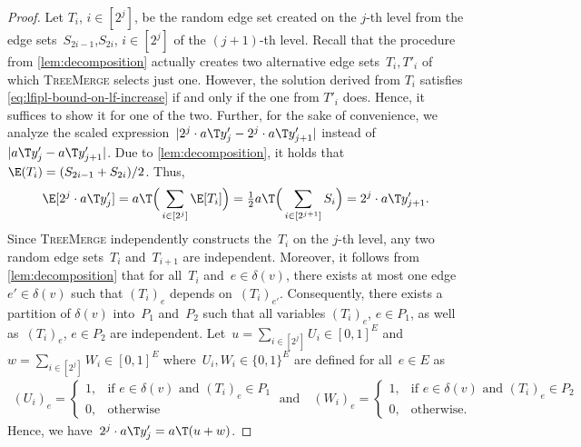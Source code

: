 \begin{proof}
    Let $T_i$, $i \in [2^{j}]$, be the random edge set created on the $j$-th level from the edge sets~$S_{2i-1}$,$S_{2i}$, $i\in [2^{j}]$ of the $(j+1)$-th level.
    Recall that the procedure from \cref{lem:decomposition} actually creates
    two alternative edge sets~$T_i,T'_i$ of which \textsc{TreeMerge} selects just one.
    However, the solution derived from $T_i$ satisfies \cref{eq:lfipl-bound-on-lf-increase} if and only if the one from $T'_i$ does. Hence, it suffices to show
    it for one of the two.
    Further, for the sake of convenience, we analyze the scaled expression~$|2^j \cdot a\T y'_j - 2^j \cdot a\T y'_{j+1}|$ instead of~$|a\T y'_j - a\T y'_{j+1}|$.
    Due to \cref{lem:decomposition}, it holds that $\E(T_i) = (S_{2i-1} + S_{2i})/2$.
    Thus,
    \begin{align*}
        \label{eq:ilf-expected-value}
        \E[2^j \cdot a\T y_{j}'] 
        = a\T \Big(\sum_{i \in [2^j]} \E[T_i] \Big)
        = \tfrac{1}{2} a\T \Big(\sum_{i \in [2^{j+1}]} S_{i} \Big)
        = 2^j \cdot a\T y_{j+1}'.
    \end{align*}
    Since \textsc{TreeMerge} independently constructs the~$T_i$ on the $j$-th level, any two random edge sets~$T_i$ and~$T_{i+1}$ are independent.
    Moreover, it follows from \cref{lem:decomposition} that for all~$T_i$ and~$e \in \delta(v)$, there exists at most one edge~$e' \in \delta(v)$ such that $(T_i)_e$ depends on~$(T_i)_{e'}$.
    Consequently, there exists a partition of $\delta(v)$ into~$P_1$ and~$P_2$ such that all variables $(T_i)_e$, $e\in P_1$, as well as~$(T_i)_e$, $e\in P_2$ are independent.
    Let~$u = \sum_{i \in [2^{j}]} U_{i} \in [0,1]^E$ and~$w = \sum_{i \in [2^{j}]} W_{i} \in [0,1]^E$ where~$U_i, W_i \in \{0,1\}^E$ are defined for all~$e \in E$ as
    \begin{align*}
        (U_i)_e =
        \begin{cases}
            1, & \text{if } e\in\delta(v) \text{ and } (T_i)_e \in P_1 \\
            0, & \text{otherwise}
        \end{cases}
        \; \text{and} \quad
        (W_i)_e =
        \begin{cases}
            1, & \text{if } e\in\delta(v) \text{ and } (T_i)_e \in P_2 \\
            0, & \text{otherwise}.
        \end{cases}
    \end{align*}
    Hence, we have~$2^j \cdot a\T y_{j}' = a\T(u + w)$.

\end{proof}
